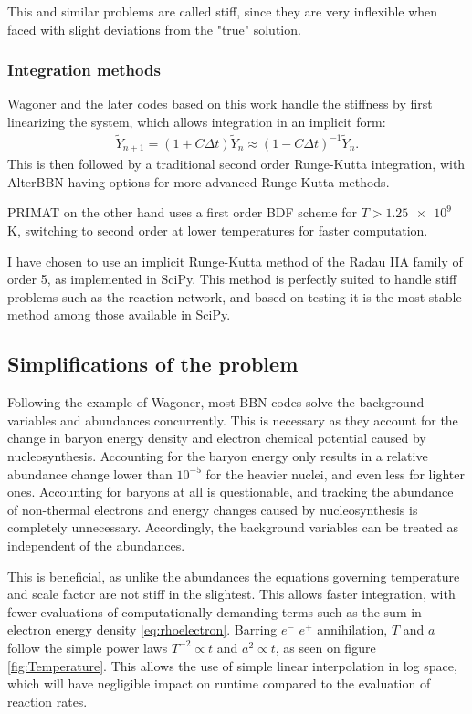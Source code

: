 This and similar problems are called stiff, since they are very inflexible when faced with slight deviations from the "true" solution. 


\subsubsection{Integration methods}

Wagoner and the later codes based on this work handle the stiffness by first linearizing the system, which allows integration in an implicit form:
\begin{align}
    \tilde{Y}_{n+1}=(1+C \Delta t)\tilde{Y}_{n}\approx(1-C \Delta t)^{-1}\tilde{Y}_{n}.
\end{align}
This is then followed by a traditional second order Runge-Kutta integration, with AlterBBN having options for more advanced Runge-Kutta methods. 

PRIMAT on the other hand uses a first order BDF scheme for $T>\num{1.25e9}$ K, switching to second order at lower temperatures for faster computation.

I have chosen to use an implicit Runge-Kutta method of the Radau IIA family of order 5, as implemented in SciPy. This method is perfectly suited to handle stiff problems such as the reaction network, and based on testing it is the most stable method among those available in SciPy.

\subsection{Simplifications of the problem}
Following the example of Wagoner, most BBN codes solve the background variables and abundances concurrently. This is necessary as they account for the change in baryon energy density and electron chemical potential caused by nucleosynthesis. Accounting for the baryon energy only results in a relative abundance change lower than $10^{-5}$ for the heavier nuclei, and even less for lighter ones. Accounting for baryons at all is questionable, and tracking the abundance of non-thermal electrons and energy changes caused by nucleosynthesis is completely unnecessary. Accordingly, the background variables can be treated as independent of the abundances.

This is beneficial, as unlike the abundances the equations governing temperature and scale factor are not stiff in the slightest. This allows faster integration, with fewer evaluations of computationally demanding terms such as the sum in electron energy density \eqref{eq:rhoelectron}. Barring $e^-$ $e^+$ annihilation, $T$ and $a$ follow the simple power laws $T^{-2}\propto t$ and $a^2\propto t$, as seen on figure \ref{fig:Temperature}. This allows the use of simple linear interpolation in log space, which will have negligible impact on runtime compared to the evaluation of reaction rates.

